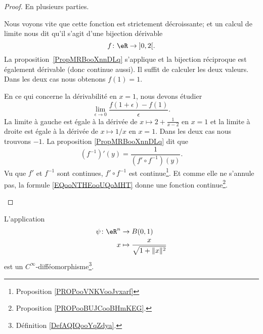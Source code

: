 \begin{proof}
	En plusieurs parties.
	\begin{subproof}
		\spitem[Bijection]
		Nous voyons vite que cette fonction est strictement décroissante; et un calcul de limite nous dit qu'il s'agit d'une bijection dérivable
		\begin{equation}
			f\colon \eR\to \mathopen] 0 , 2 \mathclose[.
		\end{equation}
		La proposition~\ref{PropMRBooXnnDLq} s'applique et la bijection réciproque est également dérivable (donc continue aussi).
		\spitem[Continue en \( x=1\)]
		Il suffit de calculer les deux valeurs. Dans les deux cas nous obtenons \( f(1)=1\).
		\spitem[Dérivable en \( x=1\)]

		En ce qui concerne la dérivabilité en \( x=1\), nous devons étudier
		\begin{equation}
			\lim_{\epsilon\to 0}\frac{ f(1+\epsilon)-f(1) }{ \epsilon }.
		\end{equation}
		La limite à gauche est égale à la dérivée de \( x\mapsto 2+\frac{ 1 }{ x-2 }\) en \( x=1\) et la limite à droite est égale à la dérivée de \( x\mapsto 1/x\) en \( x=1\). Dans les deux cas nous trouvons \( -1\).
		La proposition \ref{PropMRBooXnnDLq} dit que
		\begin{equation}		\label{EQooNTHEooUQoMHT}
			(f^{-1})'(y)=\frac{1}{ (f'\circ f^{-1})(y)}.
		\end{equation}
		Vu que \( f'\) et \( f^{-1}\) sont continues, \( f'\circ f^{-1}\) est continue\footnote{Proposition \ref{PROPooVNKVooJvxarf}}. Et comme elle ne s'annule pas, la formule \eqref{EQooNTHEooUQoMHT} donne une fonction continue\footnote{Proposition \ref{PROPooBUJCooBHmKEG}.}.

	\end{subproof}
\end{proof}


\begin{proposition}	\label{PROPooFEJXooMjsvFo}
	L'application
	\begin{equation}
		\begin{aligned}
			\psi\colon \eR^n & \to B(0,1)                               \\
			x                & \mapsto \frac{ x }{ \sqrt{1+\| x \|^2} }
		\end{aligned}
	\end{equation}
	est un \( C^{\infty}\)-difféomorphisme\footnote{Définition \ref{DefAQIQooYqZdya}.}.
\end{proposition}

